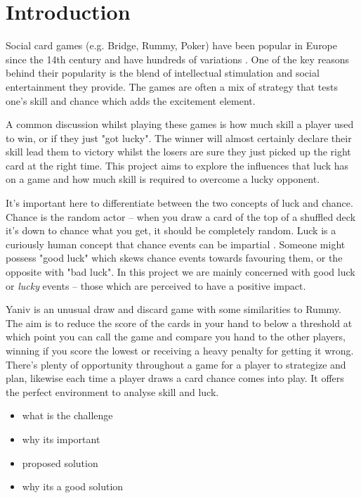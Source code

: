 \documentclass[../main.tex]{subfiles}
\begin{document}
\chapter{Introduction}
\label{cha:Introduction}

Social card games (e.g. Bridge, Rummy, Poker) have been popular in Europe since the 14th century and have hundreds of variations \cite{david_sidney_parlett_oxford_1990}. One of the key reasons behind their popularity is the blend of intellectual stimulation and social entertainment they provide. The games are often a mix of strategy that tests one's skill and chance which adds the excitement element.

A common discussion whilst playing these games is how much skill a player used to win, or if they just "got lucky". The winner will almost certainly declare their skill lead them to victory whilst the losers are sure they just picked up the right card at the right time. This project aims to explore the influences that luck has on a game and how much skill is required to overcome a lucky opponent. 

It's important here to differentiate between the two concepts of luck and chance. Chance is the random actor -- when you draw a card of the top of a shuffled deck it's down to chance what you get, it should be completely random. Luck is a curiously human concept that chance events can be impartial \cite{levinson_chance_2001}. Someone might possess "good luck" which skews chance events towards favouring them, or the opposite with "bad luck". In this project we are mainly concerned with good luck or \textit{lucky} events -- those which are perceived to have a positive impact. 

Yaniv is an unusual draw and discard game with some similarities to Rummy. The aim is to reduce the score of the cards in your hand to below a threshold at which point you can call the game and compare you hand to the other players, winning if you score the lowest or receiving a heavy penalty for getting it wrong. There's plenty of opportunity throughout a game for a player to strategize and plan, likewise each time a player draws a card chance comes into play. It offers the perfect environment to analyse skill and luck. 

\begin{itemize}[nosep]
    \item what is the challenge
    \item why its important
    \item proposed solution
    \item why its a good solution
\end{itemize}
\end{document}
